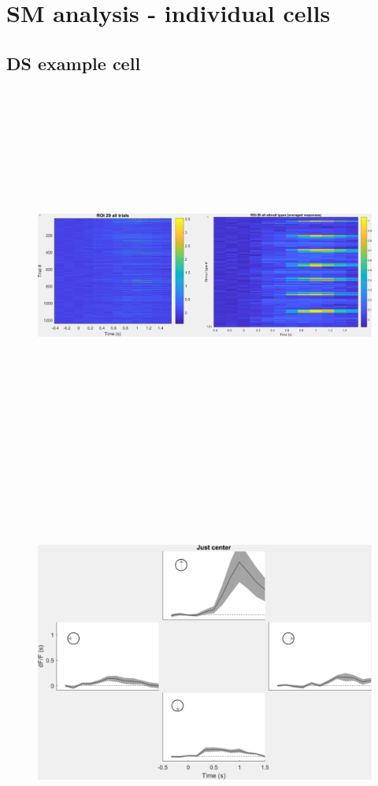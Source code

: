 \section{SM analysis - individual cells}
\subsection{DS example cell}


\begin{figure}[H] \centering \includegraphics[width=12.5cm,height=12.5cm,keepaspectratio]{Figures/7.Results/individualSM/roi 29 mf379 pos5/roi29.png} 
\end{figure}

\begin{figure}[H] \centering \includegraphics[width=12.5cm,height=12.5cm,keepaspectratio]{Figures/7.Results/individualSM/roi 29 mf379 pos5/justcenter.png} 
\end{figure}

